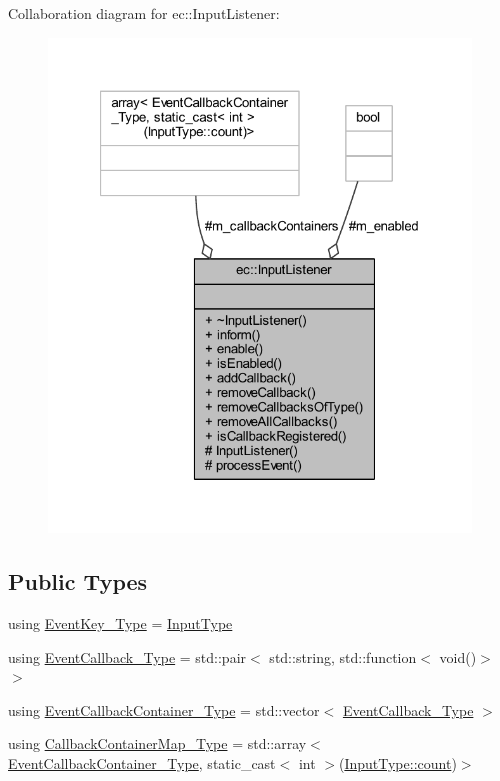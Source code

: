 Collaboration diagram for ec\+:\+:Input\+Listener\+:\nopagebreak
\begin{figure}[H]
\begin{center}
\leavevmode
\includegraphics[width=321pt]{classec_1_1_input_listener__coll__graph}
\end{center}
\end{figure}
\subsection*{Public Types}
\begin{DoxyCompactItemize}
\item 
using \mbox{\hyperlink{classec_1_1_input_listener_af5dfb691564fa8e05fcf7f053e3c532b}{Event\+Key\+\_\+\+Type}} = \mbox{\hyperlink{namespaceec_ae2d697393ea83b34b18ab14eb5dacbca}{Input\+Type}}
\item 
using \mbox{\hyperlink{classec_1_1_input_listener_acc8376886aac460c21a980c411cc1d15}{Event\+Callback\+\_\+\+Type}} = std\+::pair$<$ std\+::string, std\+::function$<$ void()$>$ $>$
\item 
using \mbox{\hyperlink{classec_1_1_input_listener_a0d9334fafd46399a39448fe00fad3c2e}{Event\+Callback\+Container\+\_\+\+Type}} = std\+::vector$<$ \mbox{\hyperlink{classec_1_1_input_listener_acc8376886aac460c21a980c411cc1d15}{Event\+Callback\+\_\+\+Type}} $>$
\item 
using \mbox{\hyperlink{classec_1_1_input_listener_abf0825f1f31a1373c5c03e51da123148}{Callback\+Container\+Map\+\_\+\+Type}} = std\+::array$<$ \mbox{\hyperlink{classec_1_1_input_listener_a0d9334fafd46399a39448fe00fad3c2e}{Event\+Callback\+Container\+\_\+\+Type}}, static\+\_\+cast$<$ int $>$(\mbox{\hyperlink{namespaceec_a30e2a743ebdeb02ac68a6cfa50f629c7ae2942a04780e223b215eb8b663cf5353}{Input\+Type\+::count}})$>$
\end{DoxyCompactItemize}
